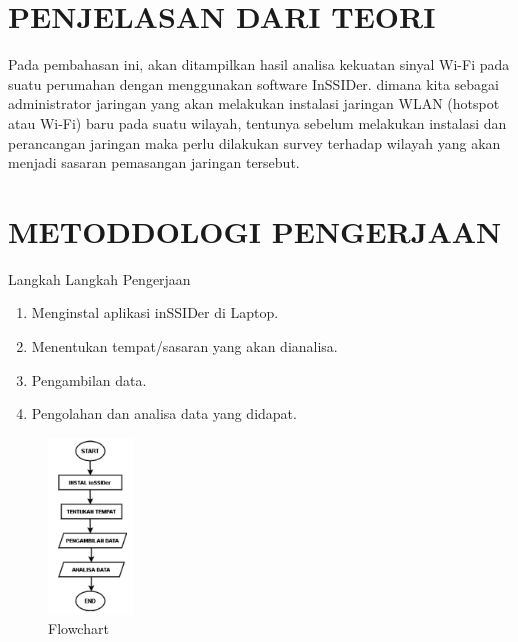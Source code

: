 \documentclass[conference]{IEEEtran}
\begin{document}
\vspace{0.3cm}

\section{PENJELASAN DARI TEORI}

\vspace{0.2cm}

Pada pembahasan ini, akan ditampilkan hasil analisa kekuatan
sinyal Wi-Fi pada suatu perumahan dengan menggunakan software InSSIDer.
dimana kita sebagai administrator jaringan yang akan melakukan instalasi jaringan WLAN (hotspot atau Wi-Fi) baru pada suatu wilayah, tentunya sebelum melakukan instalasi dan perancangan jaringan maka perlu dilakukan survey terhadap wilayah yang akan menjadi sasaran pemasangan jaringan tersebut.

\vspace{0.3cm}

\section{METODDOLOGI PENGERJAAN}

\vspace{0.2cm}
Langkah Langkah Pengerjaan
\begin{enumerate}
    \item Menginstal aplikasi inSSIDer di Laptop.
    \item Menentukan tempat/sasaran yang akan dianalisa.
    \item Pengambilan data.
    \item Pengolahan dan analisa data yang didapat.
\end{enumerate}

\begin{figure}[h]
	\centering
	\includegraphics[width=0.2\textwidth]{Gambar1.png}
	\caption{Flowchart}
\end{figure}
\end{document}

